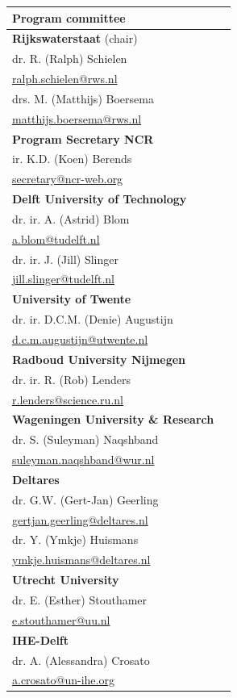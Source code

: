  
	\begin{table}
		\begin{tabular}[t]{ll}
        \textbf{Program committee}\\
        \hline
            \textbf{Rijkswaterstaat} (chair)\\
                dr. R. (Ralph) Schielen \\
                \url{ralph.schielen@rws.nl} \\
                drs. M. (Matthijs) Boersema \\
                \url{matthijs.boersema@rws.nl} \\
        	\textbf{Program Secretary NCR} \\
    	   	   ir. K.D. (Koen) Berends\\
    		  \url{secretary@ncr-web.org} \\
         	
    		\textbf{Delft University of Technology}\\
    		  dr. ir. A. (Astrid) Blom\\
    		  \url{a.blom@tudelft.nl}\\
        		dr. ir. J. (Jill) Slinger\\ 
        		\url{jill.slinger@tudelft.nl}\\
        	\textbf{University of Twente}\\
        		dr. ir. D.C.M. (Denie) Augustijn\\
        		\url{d.c.m.augustijn@utwente.nl}\\
    		\textbf{Radboud University Nijmegen}\\
        		dr. ir. R. (Rob) Lenders\\
        		\url{r.lenders@science.ru.nl}\\
            \textbf{Wageningen University \& Research}\\
                dr. S. (Suleyman) Naqshband\\
                \url{suleyman.naqshband@wur.nl}\\
            \textbf{Deltares}\\
                dr. G.W. (Gert-Jan) Geerling\\
                \url{gertjan.geerling@deltares.nl}\\
                dr. Y. (Ymkje) Huismans \\
                \url{ymkje.huismans@deltares.nl}\\
            \textbf{Utrecht University}\\
                dr. E. (Esther) Stouthamer\\
                \url{e.stouthamer@uu.nl}\\
            \textbf{IHE-Delft}\\
                dr. A. (Alessandra) Crosato\\
                \url{a.crosato@un-ihe.org}\\
                

\end{tabular}
\end{table}
